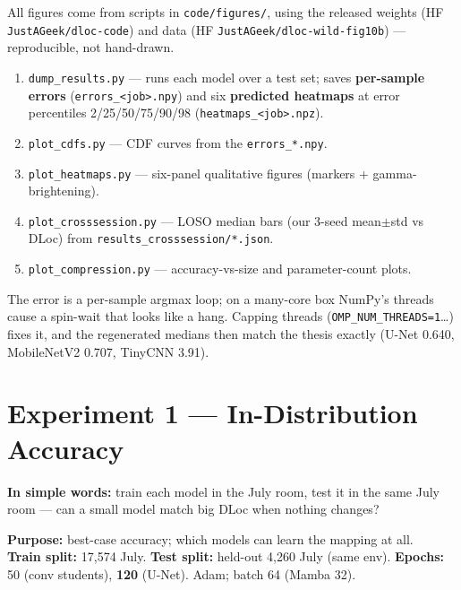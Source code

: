 \documentclass[11pt]{article}
\begin{document}
All figures come from scripts in \texttt{code/figures/}, using the released weights (HF
\texttt{JustAGeek/dloc-code}) and data (HF \texttt{JustAGeek/dloc-wild-fig10b}) --- reproducible, not
hand-drawn.
\begin{enumerate}[leftmargin=*,noitemsep]
  \item \texttt{dump\_results.py} --- runs each model over a test set; saves \textbf{per-sample errors}
        (\texttt{errors\_<job>.npy}) and six \textbf{predicted heatmaps} at error percentiles
        2/25/50/75/90/98 (\texttt{heatmaps\_<job>.npz}).
  \item \texttt{plot\_cdfs.py} --- CDF curves from the \texttt{errors\_*.npy}.
  \item \texttt{plot\_heatmaps.py} --- six-panel qualitative figures (markers + gamma-brightening).
  \item \texttt{plot\_crosssession.py} --- LOSO median bars (our 3-seed mean$\pm$std vs DLoc) from
        \texttt{results\_crosssession/*.json}.
  \item \texttt{plot\_compression.py} --- accuracy-vs-size and parameter-count plots.
\end{enumerate}

\begin{madebox}
The error is a per-sample argmax loop; on a many-core box NumPy's threads cause a spin-wait that looks
like a hang. Capping threads (\texttt{OMP\_NUM\_THREADS=1}\dots) fixes it, and the regenerated medians
then match the thesis exactly (U-Net 0.640, MobileNetV2 0.707, TinyCNN 3.91).
\end{madebox}

\section{Experiment 1 --- In-Distribution Accuracy}

\textbf{In simple words:} train each model in the July room, test it in the same July room --- can a small
model match big DLoc when nothing changes?

\textbf{Purpose:} best-case accuracy; which models can learn the mapping at all.\\
\textbf{Train split:} 17{,}574 July. \quad \textbf{Test split:} held-out 4{,}260 July (same env). \quad
\textbf{Epochs:} 50 (conv students), \textbf{120} (U-Net). Adam; batch 64 (Mamba 32).
\end{document}
